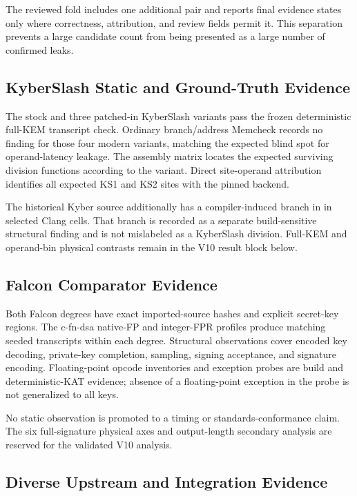 \documentclass[cryptography,article,submit,moreauthors]{Definitions/mdpi}
\begin{document}
The reviewed fold includes one additional pair and reports final evidence
states only where correctness, attribution, and review fields permit it. This
separation prevents a large candidate count from being presented as a large
number of confirmed leaks.

\subsection{KyberSlash Static and Ground-Truth Evidence}

The stock and three patched-in KyberSlash variants pass the frozen deterministic
full-KEM transcript check. Ordinary branch/address Memcheck records no finding
for those four modern variants, matching the expected blind spot for
operand-latency leakage. The assembly matrix locates the expected surviving
division functions according to the variant. Direct site-operand attribution
identifies all expected KS1 and KS2 sites with the pinned backend.

The historical Kyber source additionally has a compiler-induced branch in
 in selected Clang cells. That branch is recorded as a
separate build-sensitive structural finding and is not mislabeled as a
KyberSlash division. Full-KEM and operand-bin physical contrasts remain in the
V10 result block below.

\subsection{Falcon Comparator Evidence}

Both Falcon degrees have exact imported-source hashes and explicit secret-key
regions. The c-fn-dsa native-FP and integer-FPR profiles produce matching
seeded transcripts within each degree. Structural observations cover encoded
key decoding, private-key completion, sampling, signing acceptance, and
signature encoding. Floating-point opcode inventories and exception probes are
build and deterministic-KAT evidence; absence of a floating-point exception in
the probe is not generalized to all keys.

No static observation is promoted to a timing or standards-conformance claim.
The six full-signature physical axes and output-length secondary analysis are
reserved for the validated V10 analysis.

\subsection{Diverse Upstream and Integration Evidence}
\end{document}
